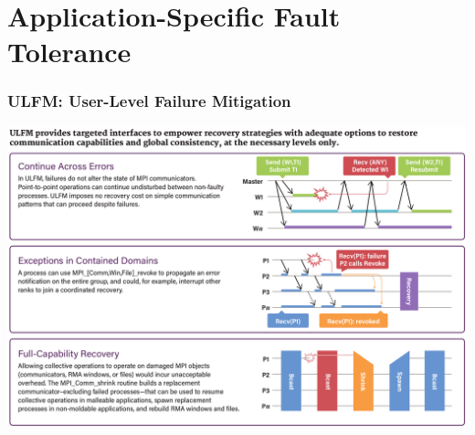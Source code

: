\section{Application-Specific Fault Tolerance}

\begin{frame}
  \frametitle{ULFM: User-Level Failure Mitigation}

  \centering\includegraphics[height=.85\textheight]{ulfm.png}

\end{frame}




